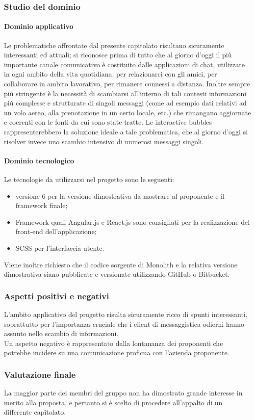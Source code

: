 		\subsubsection{Studio del dominio}
			\paragraph{Dominio applicativo}
			Le problematiche affrontate dal presente capitolato risultano sicuramente interessanti ed attuali; si riconosce prima di tutto che al 
			giorno d'oggi il più importante canale comunicativo è costituito dalle applicazioni di chat, utilizzate in ogni ambito della vita 
			quotidiana: per relazionarci con gli amici, per collaborare in ambito lavorativo, per rimanere connessi a distanza. Inoltre sempre 
			più stringente è la necessità di scambiarsi all'interno di tali contesti informazioni più complesse e strutturate di singoli messaggi 
			(come ad esempio dati relativi ad un volo aereo, alla prenotazione in un certo locale, etc.) che rimangano aggiornate e coerenti con 
			le fonti da cui sono state tratte. Le interactive bubbles rappresenterebbero la soluzione ideale a tale problematica, che al giorno 
			d'oggi si risolver invece uno scambio intensivo di numerosi messaggi singoli. 
			\paragraph{Dominio tecnologico}
			Le tecnologie da utilizzarsi nel progetto sono le seguenti:
			\begin{itemize}
				\item {} versione 6 per la versione dimostrativa da mostrare al proponente e il framework finale;
				\item Framework quali Angular.js e React.js sono consigliati per la realizzazione del front-end dell'applicazione;
				\item SCSS per l'interfaccia utente.
			\end{itemize}
			Viene inoltre richiesto che il codice sorgente di Monolith e la relativa versione dimostrativa siano pubblicate e versionate utilizzando 
			GitHub o Bitbucket.
		\subsubsection{Aspetti positivi e negativi}
		L'ambito applicativo del progetto risulta sicuramente ricco di spunti interessanti, soprattutto per l'importanza cruciale che i client di 
		messaggistica odierni hanno assunto nello scambio di informazioni.
		\\Un aspetto negativo è rappresentato dalla lontananza dei proponenti che potrebbe incidere su una comunicazione proficua con l'azienda 
		proponente.
		\subsubsection{Valutazione finale}
		La maggior parte dei membri del gruppo non ha dimostrato grande interesse in merito alla proposta, e pertanto si è scelto di procedere 
		all'appalto di un differente capitolato.

